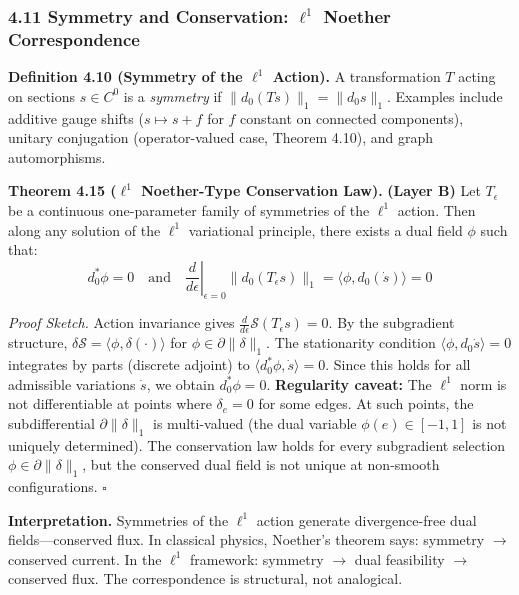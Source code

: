 \documentclass[
]{article}
\begin{document}
\subsubsection{\texorpdfstring{4.11 Symmetry and Conservation:
\(\ell^1\) Noether
Correspondence}{4.11 Symmetry and Conservation: \textbackslash ell\^{}1 Noether Correspondence}}\label{symmetry-and-conservation-ell1-noether-correspondence}

\textbf{Definition 4.10 (Symmetry of the \(\ell^1\) Action).} A
transformation \(T\) acting on sections \(s \in C^0\) is a
\emph{symmetry} if \(\|d_0(Ts)\|_1 = \|d_0 s\|_1\). Examples include
additive gauge shifts (\(s \mapsto s + f\) for \(f\) constant on
connected components), unitary conjugation (operator-valued case,
Theorem 4.10), and graph automorphisms.

\textbf{Theorem 4.15 (\(\ell^1\) Noether-Type Conservation Law).}
\textbf{(Layer B)} Let \(T_\epsilon\) be a continuous one-parameter
family of symmetries of the \(\ell^1\) action. Then along any solution
of the \(\ell^1\) variational principle, there exists a dual field
\(\phi\) such that:
\[ d_0^* \phi = 0 \quad \text{and} \quad \left.\frac{d}{d\epsilon}\right|_{\epsilon=0} \|d_0(T_\epsilon s)\|_1 = \langle \phi, d_0(\dot{s}) \rangle = 0 \]

\emph{Proof Sketch.} Action invariance gives
\(\frac{d}{d\epsilon} \mathcal{S}(T_\epsilon s) = 0\). By the
subgradient structure,
\(\delta \mathcal{S} = \langle \phi, \delta(\cdot) \rangle\) for
\(\phi \in \partial \|\delta\|_1\). The stationarity condition
\(\langle \phi, d_0 \dot{s} \rangle = 0\) integrates by parts (discrete
adjoint) to \(\langle d_0^* \phi, \dot{s} \rangle = 0\). Since this
holds for all admissible variations \(\dot{s}\), we obtain
\(d_0^* \phi = 0\). \textbf{Regularity caveat:} The \(\ell^1\) norm is
not differentiable at points where \(\delta_e = 0\) for some edges. At
such points, the subdifferential \(\partial \|\delta\|_1\) is
multi-valued (the dual variable \(\phi(e) \in [-1, 1]\) is not uniquely
determined). The conservation law holds for every subgradient selection
\(\phi \in \partial \|\delta\|_1\), but the conserved dual field is not
unique at non-smooth configurations. \(\square\)

\textbf{Interpretation.} Symmetries of the \(\ell^1\) action generate
divergence-free dual fields---conserved flux. In classical physics,
Noether's theorem says: symmetry \(\to\) conserved current. In the
\(\ell^1\) framework: symmetry \(\to\) dual feasibility \(\to\)
conserved flux. The correspondence is structural, not analogical.
\end{document}
